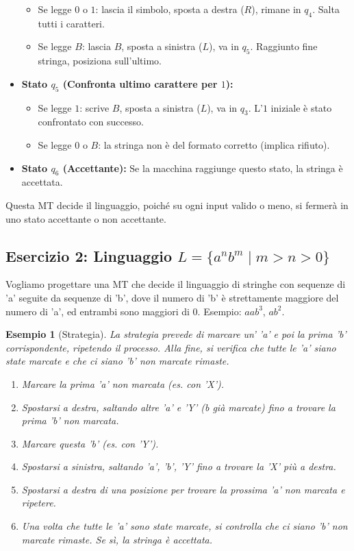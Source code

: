 \documentclass[a4paper, 11pt]{book} %
\newtheorem{example}[theorem]{Esempio}
\theoremstyle{definition}
\begin{document}
\begin{itemize}
    \begin{itemize}
        \item Se legge $0$ o $1$: lascia il simbolo, sposta a destra ($R$), rimane in $q_4$. Salta tutti i caratteri.
        \item Se legge $B$: lascia $B$, sposta a sinistra ($L$), va in $q_5$. Raggiunto fine stringa, posiziona sull'ultimo.
    \end{itemize}
    \item \textbf{Stato $q_5$ (Confronta ultimo carattere per $1$):}
    \begin{itemize}
        \item Se legge $1$: scrive $B$, sposta a sinistra ($L$), va in $q_3$. L'$1$ iniziale è stato confrontato con successo.
        \item Se legge $0$ o $B$: la stringa non è del formato corretto (implica rifiuto).
    \end{itemize}
    \item \textbf{Stato $q_6$ (Accettante):} Se la macchina raggiunge questo stato, la stringa è accettata.
\end{itemize}
Questa MT decide il linguaggio, poiché su ogni input valido o meno, si fermerà in uno stato accettante o non accettante.

\subsection{Esercizio 2: Linguaggio $L = \{a^n b^m \mid m > n > 0\}$}

Vogliamo progettare una MT che decide il linguaggio di stringhe con sequenze di 'a' seguite da sequenze di 'b', dove il numero di 'b' è strettamente maggiore del numero di 'a', ed entrambi sono maggiori di $0$. Esempio: $aab^{3}$, $ab^{2}$.

\begin{example}[Strategia]
La strategia prevede di marcare un' 'a' e poi la prima 'b' corrispondente, ripetendo il processo. Alla fine, si verifica che tutte le 'a' siano state marcate e che ci siano 'b' non marcate rimaste.
\begin{enumerate}
    \item Marcare la prima 'a' non marcata (es. con 'X').
    \item Spostarsi a destra, saltando altre 'a' e 'Y' (b già marcate) fino a trovare la prima 'b' non marcata.
    \item Marcare questa 'b' (es. con 'Y').
    \item Spostarsi a sinistra, saltando 'a', 'b', 'Y' fino a trovare la 'X' più a destra.
    \item Spostarsi a destra di una posizione per trovare la prossima 'a' non marcata e ripetere.
    \item Una volta che tutte le 'a' sono state marcate, si controlla che ci siano 'b' non marcate rimaste. Se sì, la stringa è accettata.
\end{enumerate}
\end{example}
\end{document}
